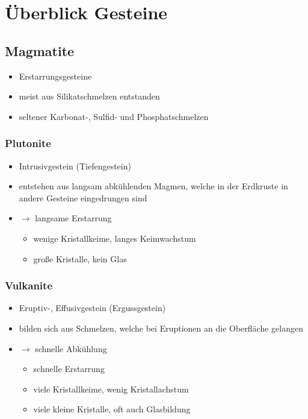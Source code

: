 \documentclass[a4, 12pt]{scrreprt}
\begin{document}
\tableofcontents



\part{Überblick Gesteine}

\chapter{Magmatite}

\begin{itemize}
\item Erstarrungsgesteine
\item meist aus Silikatschmelzen entstanden
\item seltener Karbonat-, Sulfid- und Phosphatschmelzen
\end{itemize}

\section{Plutonite}

\begin{itemize}
\item Intrusivgestein (Tiefengestein)
\item entstehen aus langsam abkühlenden Magmen, welche in der Erdkruste in andere Gesteine eingedrungen sind
\item $\rightarrow$ langsame Erstarrung \begin{itemize}
\item wenige Kristallkeime, langes Keimwachstum
\item große Kristalle, kein Glas
\end{itemize}
\end{itemize}

\section{Vulkanite}
\begin{itemize}
\item Eruptiv-, Effusivgestein (Ergussgestein)
\item bilden sich aus Schmelzen, welche bei Eruptionen an die Oberfläche gelangen
\item $\rightarrow$ schnelle Abkühlung
\begin{itemize}
\item schnelle Erstarrung
\item viele Kristallkeime, wenig Kristallachstum
\item viele kleine Kristalle, oft auch Glasbildung
\end{itemize}
\end{itemize}
\end{document}
